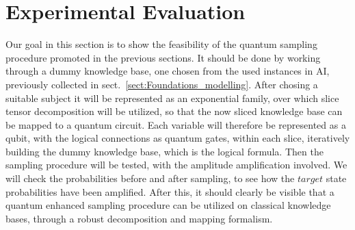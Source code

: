 \documentclass[encoding=utf8,british]{tumphthesis}
\begin{document}




\chapter{Experimental Evaluation}
\label{chapter:4}

Our goal in this section is to show the feasibility of the quantum sampling procedure promoted in the previous sections. It should be done by working through a 
dummy knowledge base, one chosen from the used instances in AI, previously collected in sect.~\ref{sect:Foundations_modelling}. After chosing a suitable subject
it will be represented as an exponential family, over which slice tensor decomposition will be utilized, so that the now sliced knowledge base can be mapped to a 
quantum circuit. Each variable will therefore be represented as a qubit, with the logical connections as quantum gates, within each slice, iteratively building the
dummy knowledge base, which is the logical formula. Then the sampling procedure will be tested, with the amplitude amplification involved. We will check the probabilities 
before and after sampling, to see how the $target$ state probabilities have been amplified. After this, it should clearly be visible that a quantum enhanced sampling procedure
can be utilized on classical knowledge bases, through a robust decomposition and mapping formalism.
\end{document}
